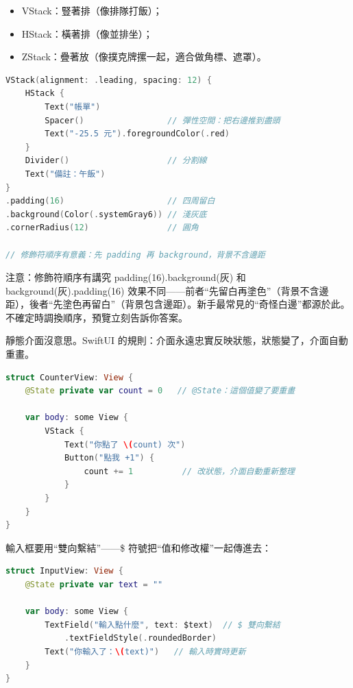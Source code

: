 \begin{itemize}
  \item VStack：豎著排（像排隊打飯）；
  \item HStack：橫著排（像並排坐）；
  \item ZStack：疊著放（像撲克牌摞一起，適合做角標、遮罩）。
\end{itemize}

\begin{lstlisting}[language=Swift]
VStack(alignment: .leading, spacing: 12) {
    HStack {
        Text("帳單")
        Spacer()                 // 彈性空間：把右邊推到盡頭
        Text("-25.5 元").foregroundColor(.red)
    }
    Divider()                    // 分割線
    Text("備註：午飯")
}
.padding(16)                     // 四周留白
.background(Color(.systemGray6)) // 淺灰底
.cornerRadius(12)                // 圓角

// 修飾符順序有意義：先 padding 再 background，背景不含邊距
\end{lstlisting}

\begin{tcbwarn}{注意：修飾符順序有講究}
padding(16).background(灰) 和 background(灰).padding(16) 效果不同——前者“先留白再塗色”（背景不含邊距），後者“先塗色再留白”（背景包含邊距）。新手最常見的“奇怪白邊”都源於此。不確定時調換順序，預覽立刻告訴你答案。

\end{tcbwarn}


靜態介面沒意思。SwiftUI 的規則：介面永遠忠實反映狀態，狀態變了，介面自動重畫。

\begin{lstlisting}[language=Swift]
struct CounterView: View {
    @State private var count = 0   // @State：這個值變了要重畫

    var body: some View {
        VStack {
            Text("你點了 \(count) 次")
            Button("點我 +1") {
                count += 1          // 改狀態，介面自動重新整理
            }
        }
    }
}
\end{lstlisting}

輸入框要用“雙向繫結”——\$ 符號把“值和修改權”一起傳進去：

\begin{lstlisting}[language=Swift]
struct InputView: View {
    @State private var text = ""

    var body: some View {
        TextField("輸入點什麼", text: $text)  // $ 雙向繫結
            .textFieldStyle(.roundedBorder)
        Text("你輸入了：\(text)")   // 輸入時實時更新
    }
}
\end{lstlisting}

